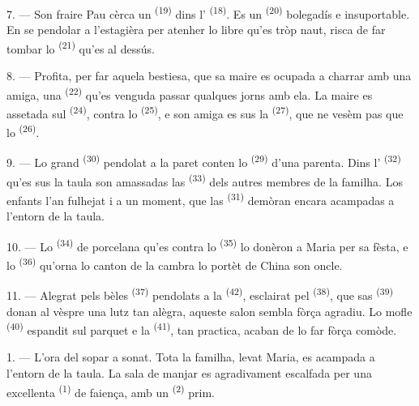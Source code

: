 \VUsaut{5.0mm}
\VUsaut{3.0mm}

7. --- Son fraire Pau cèrca un  \textsuperscript{(19)} dins
l' \textsuperscript{(18)}. Es un 
\textsuperscript{(20)} bolegadís e insuportable. En se pendolar a l'estagièra per
atenher lo libre qu'es tròp naut, risca de far tombar lo 
\textsuperscript{(21)} qu'es al dessús.

8. --- Profita, per far aquela bestiesa, que sa maire es ocupada a charrar amb
una amiga, una  \textsuperscript{(22)} qu'es venguda passar qualques
jorns amb ela. La maire es assetada sul  \textsuperscript{(24)},
contra lo  \textsuperscript{(25)}, e son amiga es sus la
 \textsuperscript{(27)}, que ne vesèm pas que lo
 \textsuperscript{(26)}.

9. --- Lo grand  \textsuperscript{(30)} pendolat a la paret conten lo
 \textsuperscript{(29)} d'una parenta. Dins l'
\textsuperscript{(32)} qu'es sus la taula son amassadas las 
\textsuperscript{(33)} dels autres membres de la familha. Los enfants l'an
fulhejat i a un moment, que las  \textsuperscript{(31)}
demòran encara acampadas a l'entorn de la taula.

10. --- Lo  \textsuperscript{(34)} de porcelana qu'es contra lo
 \textsuperscript{(35)} lo donèron a Maria per sa fèsta, e lo
 \textsuperscript{(36)} qu'orna lo canton de la cambra lo portèt
de China son oncle.

11. --- Alegrat pels bèles  \textsuperscript{(37)} pendolats a la
 \textsuperscript{(42)}, esclairat pel 
\textsuperscript{(38)}, que sas  \textsuperscript{(39)} donan al
vèspre una lutz tan alègra, aqueste salon sembla fòrça agradiu. Lo mofle
 \textsuperscript{(40)} espandit sul parquet e la  \textsuperscript{(41)}, tan practica, acaban de lo far fòrça comòde.

\VUsaut{3.6mm}
\VUsaut{3.0mm}

1. --- L'ora del sopar a sonat. Tota la familha, levat Maria, es acampada a
l'entorn de la taula. La sala de manjar es agradivament escalfada per una
excellenta  \textsuperscript{(1)} de faiença, amb un 
\textsuperscript{(2)} prim.

